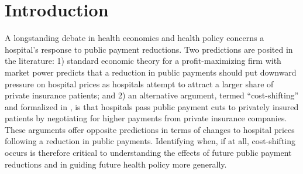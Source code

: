 \documentclass[12pt]{article}
\begin{document}
\newpage
\section{Introduction}
\doublespacing
A longstanding debate in health economics and health policy concerns a hospital's response to public payment reductions. Two predictions are posited in the literature: 1) standard economic theory for a profit-maximizing firm with market power predicts that a reduction in public payments should put downward pressure on hospital prices as hospitals attempt to attract a larger share of private insurance patients; and 2) an alternative argument, termed ``cost-shifting'' and formalized in \cite{dranove1988}, is that hospitals pass public payment cuts to privately insured patients by negotiating for higher payments from private insurance companies. These arguments offer opposite predictions in terms of changes to hospital prices following a reduction in public payments. Identifying when, if at all, cost-shifting occurs is therefore critical to understanding the effects of future public payment reductions and in guiding future health policy more generally.
\end{document}
